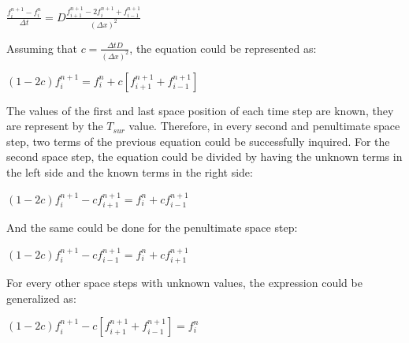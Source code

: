 \documentclass[12pt]{report}
\begin{document}
\begin{center}
\Large
$
\frac{f_i^{n + 1} - f_i^{n}}{\Delta t} = D \frac{f_{i + 1}^{n + 1} - 2f_{i}^{n + 1} + f_{i - 1}^{n + 1}}{(\Delta x)^2} 
$
\end{center}

\par Assuming that $c = \frac{\Delta t D}{(\Delta x)^2}$, the equation could be represented as:

\begin{center}
\Large
$
(1 - 2c)f_i^{n + 1} = f_i^n + c \left[f_{i + 1}^{n + 1} + f_{i - 1}^{n + 1}\right]
$
\end{center}

\par The values of the first and last space position of each time step are known, they are represent by the $T_{sur}$ value. Therefore, in every second and penultimate space step, two terms of the previous equation could be successfully inquired. For the second space step, the equation could be divided by having the unknown terms in the left side and the known terms in the right side:

\begin{center}
\Large
$
(1 - 2c)f_i^{n + 1} - c f_{i + 1}^{n + 1} = f_i^n + c f_{i - 1}^{n + 1}
$
\end{center}

\par And the same could be done for the penultimate space step:

\begin{center}
\Large
$
(1 - 2c)f_i^{n + 1} - c f_{i - 1}^{n + 1} = f_i^n + c f_{i + 1}^{n + 1}
$
\end{center}

\par For every other space steps with unknown values, the expression could be generalized as:

\begin{center}
\Large
$
(1 - 2c)f_i^{n + 1} - c \left[f_{i + 1}^{n + 1} + f_{i - 1}^{n + 1}\right] = f_i^n 
$
\end{center}
\end{document}
